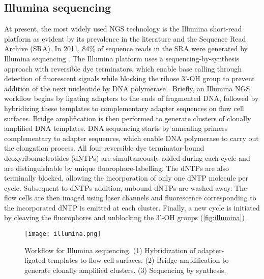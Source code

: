
\subsection{Illumina sequencing}

At present, the most widely used NGS technology is the Illumina short-read platform as evident by its prevalence in the literature and the Sequence Read Archive (SRA). In 2011, 84\% of sequence reads in the SRA were generated by Illumina sequencing \cite{Kodama2012}. The Illumina platform uses a sequencing-by-synthesis approach with reversible dye terminators, which enable base calling through detection of fluorescent signals while blocking the ribose 3'-OH group to prevent addition of the next nucleotide by DNA polymerase \cite{Bentley2008, Guo2008}. Briefly, an Illumina NGS workflow begins by ligating adapters to the ends of fragmented DNA, followed by hybridizing these templates to complementary adapter sequences on flow cell surfaces. Bridge amplification is then performed to generate clusters of clonally amplified DNA templates. DNA sequencing starts by annealing primers complementary to adapter sequences, which enable DNA polymerase to carry out the elongation process. All four reversible dye terminator-bound deoxyribonucleotides (\acs{dNTP}s) are simultaneously added during each cycle and are distinguishable by unique fluorophore-labelling. The dNTPs are also terminally blocked, allowing the incorporation of only one dNTP molecule per cycle. Subsequent to dNTPs addition, unbound dNTPs are washed away. The flow cells are then imaged using laser channels and fluorescence corresponding to the incorporated dNTP is emitted at each cluster. Finally, a new cycle is initiated by cleaving the fluorophores and unblocking the 3'-OH groups (\autoref{fig:illumina}) \cite{Mardis2013, Goodwin2016, Levy2016, Mardis2017}.


\newpage
\begin{landscape}

\begin{figure}[H]
	\centering
	\texttt{[image: illumina.png]}
	\caption[Workflow for Illumina sequencing.]{Workflow for Illumina sequencing. (1) Hybridization of adapter-ligated templates to flow cell surfaces. (2) Bridge amplification to generate clonally amplified clusters. (3) Sequencing by synthesis.}
	\label{fig:illumina}
\end{figure}

\end{landscape}

